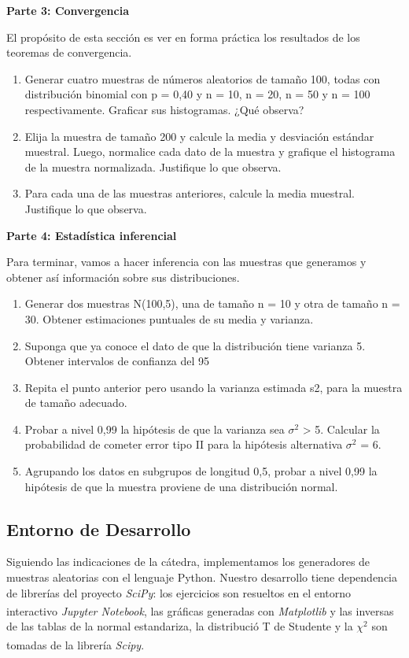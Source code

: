 \documentclass[11pt]{article}
\let\originalcite\cite
\renewcommand{\cite}[2][]{\textsuperscript{\originalcite{#2}}}
\begin{document}
{\textbf{Parte 3: Convergencia}}

El propósito de esta sección es ver en forma práctica los resultados de los teoremas de convergencia.
\begin{enumerate}
\item Generar cuatro muestras de números aleatorios de tamaño 100, todas con distribución binomial con p = 0,40 y n = 10, n = 20, n = 50 y n = 100 respectivamente. Graficar sus histogramas. ¿Qué observa?
\item Elija la muestra de tamaño 200 y calcule la media y desviación estándar muestral. Luego, normalice cada dato de la muestra y grafique el histograma de la muestra normalizada. Justifique lo que observa.
\item Para cada una de las muestras anteriores, calcule la media muestral. Justifique lo que observa.
\end{enumerate}

{\textbf{Parte 4: Estadística inferencial}}

Para terminar, vamos a hacer inferencia con las muestras que generamos y obtener así información sobre sus distribuciones.
\begin{enumerate}
\item Generar dos muestras N(100,5), una de tamaño n = 10 y otra de tamaño n = 30. Obtener estimaciones puntuales de su media y varianza.
\item Suponga que ya conoce el dato de que la distribución tiene varianza 5. Obtener intervalos de confianza del 95%
\item Repita el punto anterior pero usando la varianza estimada s2, para la muestra de tamaño adecuado.
\item Probar a nivel 0,99 la hipótesis de que la varianza sea $\sigma^2$ > 5. Calcular la probabilidad de cometer error tipo II para la hipótesis alternativa $\sigma^2$ = 6.
\item Agrupando los datos en subgrupos de longitud 0,5, probar a nivel 0,99 la hipótesis de que la muestra proviene de una distribución normal.
\end{enumerate}

\subsection{Entorno de Desarrollo}

Siguiendo las indicaciones de la cátedra, implementamos los 
generadores de muestras aleatorias con el lenguaje Python. 
Nuestro desarrollo tiene dependencia de librerías del 
proyecto \textit{SciPy}: los ejercicios son resueltos
en el entorno interactivo \textit{Jupyter Notebook}\cite{bib:jupyter},
las gráficas generadas con \textit{Matplotlib}\cite{bib:matplot} y
las inversas de las tablas de la normal estandariza, la 
distribució T de Studente y la $\chi^2$ son tomadas de la
librería \textit{Scipy}\cite{bib:scipylib}.
\end{document}
